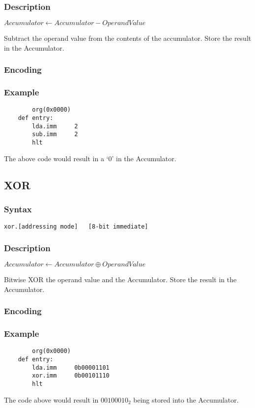     \subsubsection{Description}
    $Accumulator \leftarrow Accumulator - OperandValue$
    \par Subtract the operand value from the contents of the accumulator.
    Store the result in the Accumulator.

    \subsubsection{Encoding}

    \subsubsection{Example}
    \begin{verbatim}
        org(0x0000)
    def entry:
        lda.imm     2
        sub.imm     2
        hlt
    \end{verbatim}
    \par The above code would result in a `0' in the Accumulator.

\pagebreak
\subsection{XOR}\label{subsec:xor}
    \subsubsection{Syntax}
    \begin{verbatim}xor.[addressing mode]   [8-bit immediate]\end{verbatim}

    \subsubsection{Description}
    $Accumulator \leftarrow Accumulator \oplus OperandValue$
    \par Bitwise XOR the operand value and the Accumulator.
    Store the result in the Accumulator.

    \subsubsection{Encoding}
    \subsubsection{Example}
    \begin{verbatim}
        org(0x0000)
    def entry:
        lda.imm     0b00001101
        xor.imm     0b00101110
        hlt
    \end{verbatim}
    \par The code above would result in $00100010_{2}$ being stored into the Accumulator.

